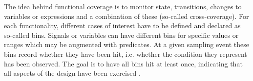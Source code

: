 The idea behind functional coverage is to monitor state, transitions, changes to variables or expressions and a
combination of these (so-called cross-coverage). For each functionality, different cases of interest have to be
defined and declared as so-called bins. Signals or variables can have different bins for specific values or ranges
which may be augmented with predicates. At a given sampling event these bins record whether they have been hit, i.e.
whether the condition they represent has been observed. The goal is to have all bins hit at least once, indicating
that all aspects of the design have been exercised \cite[Sec. 7.6]{flake2020a}.

